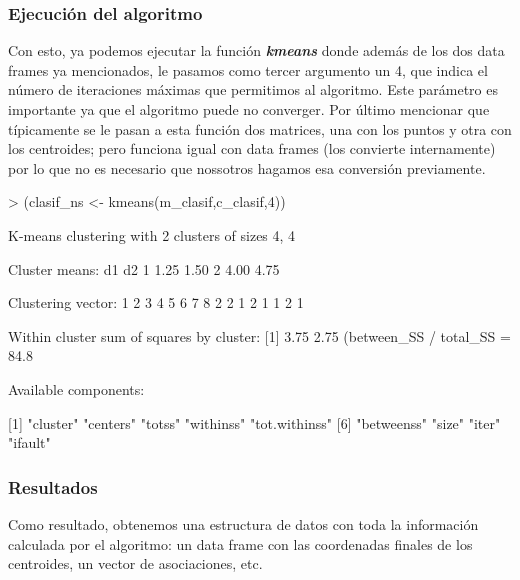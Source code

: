 \documentclass [a4paper] {article}
\begin{document}
\subsubsection{Ejecución del algoritmo}
Con esto, ya podemos ejecutar la función \textbf{\textit{kmeans}} donde además de los dos data frames ya mencionados, le pasamos como tercer argumento un 4, que indica el número de iteraciones máximas que permitimos al algoritmo. Este parámetro es importante ya que el algoritmo puede no converger. Por último mencionar que típicamente se le pasan a esta función dos matrices, una con los puntos y otra con los centroides; pero funciona igual con data frames (los convierte internamente) por lo que no es necesario que nossotros hagamos esa conversión previamente.
\vspace{5mm}
\begin{Schunk}
\begin{Sinput}
> (clasif_ns <- kmeans(m_clasif,c_clasif,4))
\end{Sinput}
\begin{Soutput}
K-means clustering with 2 clusters of sizes 4, 4

Cluster means:
    d1   d2
1 1.25 1.50
2 4.00 4.75

Clustering vector:
1 2 3 4 5 6 7 8 
2 2 1 2 1 1 2 1 

Within cluster sum of squares by cluster:
[1] 3.75 2.75
 (between_SS / total_SS =  84.8 %)

Available components:

[1] "cluster"      "centers"      "totss"        "withinss"     "tot.withinss"
[6] "betweenss"    "size"         "iter"         "ifault"      
\end{Soutput}
\end{Schunk}

\subsubsection{Resultados}
Como resultado, obtenemos una estructura de datos con toda la información calculada por el algoritmo: un data frame con las coordenadas finales de los centroides, un vector de asociaciones, etc.
\end{document}
